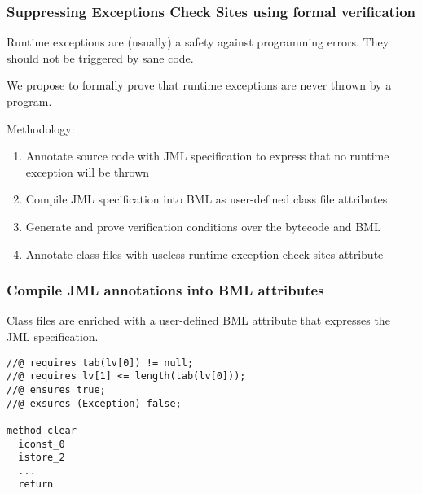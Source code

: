 \documentclass{beamer}
\begin{document}
\begin{frame}\frametitle{Suppressing Exceptions Check Sites using formal verification}

Runtime exceptions are (usually) a safety against programming errors. They should not be triggered by sane code.

We propose to formally prove that runtime exceptions are never thrown by a program.

Methodology:
\begin{enumerate}
\item Annotate source code with JML specification to express that no runtime exception will be thrown
\item Compile JML specification into BML as user-defined class file attributes
\item Generate and prove verification conditions over the bytecode and BML
\item Annotate class files with useless runtime exception check sites attribute
\end{enumerate}
\end{frame}

%
%

\begin{frame}[fragile]
\frametitle{Compile JML annotations into BML attributes}

Class files are enriched with a user-defined BML attribute that expresses the JML specification.

\begin{lstlisting}[language=jvmis]
//@ requires tab(lv[0]) != null;
//@ requires lv[1] <= length(tab(lv[0]));
//@ ensures true;
//@ exsures (Exception) false;

method clear
  iconst_0
  istore_2
  ...
  return
\end{lstlisting}
\end{frame}
\end{document}
